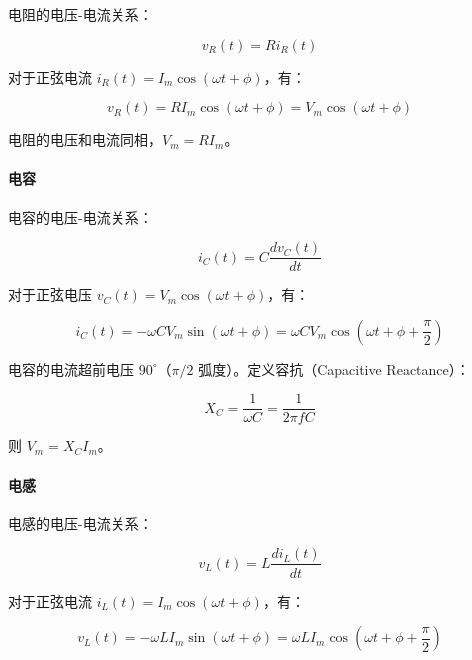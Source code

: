 电阻的电压-电流关系：

\begin{equation}
v_R(t) = R i_R(t) \label{eq:resistor-ac}
\end{equation}

对于正弦电流 $i_R(t) = I_m \cos(\omega t + \phi)$，有：

\begin{equation}
v_R(t) = R I_m \cos(\omega t + \phi) = V_m \cos(\omega t + \phi)
\end{equation}

电阻的电压和电流同相，$V_m = R I_m$。

\paragraph{电容}

电容的电压-电流关系：

\begin{equation}
i_C(t) = C \frac{dv_C(t)}{dt} \label{eq:capacitor-ac}
\end{equation}

对于正弦电压 $v_C(t) = V_m \cos(\omega t + \phi)$，有：

\begin{equation}
i_C(t) = -\omega C V_m \sin(\omega t + \phi) = \omega C V_m \cos(\omega t + \phi + \frac{\pi}{2})
\end{equation}

电容的电流超前电压 $90^\circ$（$\pi/2$ 弧度）。定义容抗（Capacitive Reactance）：

\begin{equation}
X_C = \frac{1}{\omega C} = \frac{1}{2\pi f C} \label{eq:capacitive-reactance}
\end{equation}

则 $V_m = X_C I_m$。

\paragraph{电感}

电感的电压-电流关系：

\begin{equation}
v_L(t) = L \frac{di_L(t)}{dt} \label{eq:inductor-ac}
\end{equation}

对于正弦电流 $i_L(t) = I_m \cos(\omega t + \phi)$，有：

\begin{equation}
v_L(t) = -\omega L I_m \sin(\omega t + \phi) = \omega L I_m \cos(\omega t + \phi + \frac{\pi}{2})
\end{equation}

